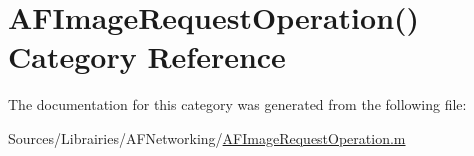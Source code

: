 \hypertarget{category_a_f_image_request_operation_07_08}{\section{A\-F\-Image\-Request\-Operation() Category Reference}
\label{category_a_f_image_request_operation_07_08}
}


The documentation for this category was generated from the following file\-:\begin{DoxyCompactItemize}
\item 
Sources/\-Librairies/\-A\-F\-Networking/\hyperlink{_a_f_image_request_operation_8m}{A\-F\-Image\-Request\-Operation.\-m}\end{DoxyCompactItemize}
